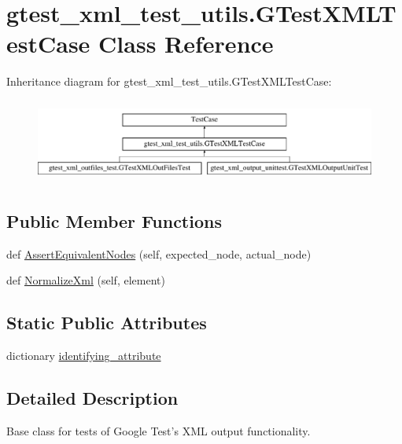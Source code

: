 \hypertarget{classgtest__xml__test__utils_1_1GTestXMLTestCase}{}\section{gtest\+\_\+xml\+\_\+test\+\_\+utils.\+G\+Test\+X\+M\+L\+Test\+Case Class Reference}
\label{classgtest__xml__test__utils_1_1GTestXMLTestCase}
Inheritance diagram for gtest\+\_\+xml\+\_\+test\+\_\+utils.\+G\+Test\+X\+M\+L\+Test\+Case\+:\begin{figure}[H]
\begin{center}
\leavevmode
\includegraphics[height=2.781457cm]{classgtest__xml__test__utils_1_1GTestXMLTestCase}
\end{center}
\end{figure}
\subsection*{Public Member Functions}
\begin{DoxyCompactItemize}
\item 
def \mbox{\hyperlink{classgtest__xml__test__utils_1_1GTestXMLTestCase_a977273e8863f4f41d121bb5a64b08d32}{Assert\+Equivalent\+Nodes}} (self, expected\+\_\+node, actual\+\_\+node)
\item 
def \mbox{\hyperlink{classgtest__xml__test__utils_1_1GTestXMLTestCase_ac4823e96c3b5327b25a340a3605447d9}{Normalize\+Xml}} (self, element)
\end{DoxyCompactItemize}
\subsection*{Static Public Attributes}
\begin{DoxyCompactItemize}
\item 
dictionary \mbox{\hyperlink{classgtest__xml__test__utils_1_1GTestXMLTestCase_a0e3a4e84e18f29d2248dcd670a0a6ae6}{identifying\+\_\+attribute}}
\end{DoxyCompactItemize}


\subsection{Detailed Description}
\begin{DoxyVerb}Base class for tests of Google Test's XML output functionality.
\end{DoxyVerb}
 


